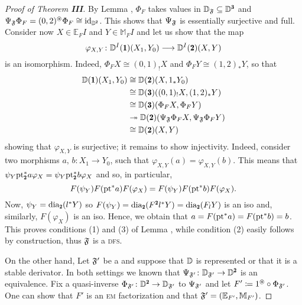 \begin{proof}[Proof of Theorem \textbf{III}]
By Lemma , $\Phi_F$ takes values in $\D_\F\subseteq \D^\tre$ and $\Psi_\F\Phi_F=(0,2)^\circledast\Phi_F\cong \id_{\D^\due}$. This shows that $\Psi_{\mathfrak{F}}$ is essentially surjective and full. Consider now $X\in \mathbb E_FI$ and $Y\in \mathbb M_FI$ and let us show that the map 
\[
\varphi_{X,Y}\colon\D^I(\uno)(X_1,Y_0)\longrightarrow \D^I(\due)(X,Y)
\] 
is an isomorphism. Indeed, $\Phi_F X\cong (0,1)_!X$ and $\Phi_F Y\cong (1,2)_*Y$, so that
\begin{align*}
\D(\uno)(X_1,Y_0) &\cong \D(\due)(X,1_*Y_0)\\
& \cong \D(\tre)((0,1)_!X,(1,2)_*Y)\\
& \cong \D(\tre)(\Phi_F X,\Phi_F Y)\\
& \twoheadrightarrow\D(\due)(\Psi_\F\Phi_F X,\Psi_\F\Phi_F Y)\\
& \cong \D(\due)(X,Y)
\end{align*}
showing that $\varphi_{X,Y}$ is surjective; it remains to show injectivity. Indeed, consider two morphisms $a,\, b\colon X_1\to Y_0$, such that 
$\varphi_{X,Y}(a)=\varphi_{X,Y}(b)$. This means that $\psi_Y\pt_\due^*a\varphi_X=\psi_Y\pt_\due^*b\varphi_X$ and so, in particular,
\[
F(\psi_Y)F(\text{pt}^*a)F(\varphi_X)=F(\psi_Y)F(\text{pt}^*b)F(\varphi_X).
\]
Now, $\psi_Y=\dia_{\due}(l^*Y)$ so $F(\psi_Y)=\dia_{\due}(F^{\due}l^*Y)=\dia_{\due}(F_lY)$ is an iso and, similarly, $F(\varphi_X)$ is an iso. 
Hence, we obtain that $a= F(\text{pt}^*a)=F(\text{pt}^* b)=b$. This proves conditions (1) and (3) of Lemma , while condition (2) easily follows by construction, thus $\mathfrak{F}$ is a \textsc{dfs}.

On the other hand, Let $\mathfrak{F}'$ be a \dfs and suppose that $\mathbb{D}$ is represented or that it is a stable derivator. In both settings we known that $\Psi_{\F'}\colon \D_{\F'}\to \D^{\due}$ is an equivalence. Fix a quasi-inverse $\Phi_{\F'}\colon \D^{\due}\to \D_{\F'}$ to $\Psi_{\mathfrak{F}'}$ and let $F' \coloneqq 1^\protect{\tiny \oast}\circ\Phi_{\mathfrak{F}'}$. One can show that $F'$ is an \textsc{em} factorization and that $\mathfrak{F}'=(\mathbb E_{F'},\mathbb M_{F'})$.
\end{proof}
